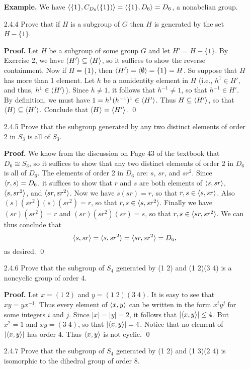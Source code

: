 \begin{enumerate}
      \textbf{Example.} We have $\langle \{1\}, C_{D_6}(\{1\}) \rangle =
      \langle \{1\}, D_6 \rangle= D_6$, a nonabelian group.
   \item[2.4.4]   Prove that if $H$ is a subgroup of $G$ then $H$ is generated
                  by the set $H - \{1\}$.

      \textbf{Proof.} Let $H$ be a subgroup of some group $G$ and let
      $H' = H - \{1\}$. By Exercise 2, we have $\langle H' \rangle \subseteq \langle H \rangle$, so
      it suffices to show the reverse containment. Now if $H = \{1\}$, then
      $\langle H' \rangle = \langle \emptyset \rangle = \{1\} = H$. So suppose that $H$ has more
      than 1 element. Let $h$ be a nonidentity element in $H$ (i.e.,
      $h^1 \in H'$, and thus, $h^1 \in \langle H' \rangle$).
      Since $h \neq 1$, it follows that $h^{-1} \neq 1$, so that
      $h^{-1} \in H'$. By definition, we must
      have $1 = h^1(h^{-1})^1 \in  \langle H' \rangle$. Thus $H \subseteq \langle H' \rangle$, so
      that $\langle H \rangle \subseteq \langle H' \rangle$. Conclude that
      $\langle H \rangle = \langle H' \rangle$. \qed
   \item[2.4.5]   Prove that the subgroup generated by any two distinct elements
                  of order 2 in $S_3$ is all of $S_3$.

      \textbf{Proof.} We know from the discussion on Page 43 of the textbook
      that $D_6 \cong S_3$, so it suffices to show that any two distinct
      elements of order 2 in $D_6$ is all of $D_6$. The elements of order 2 in
      $D_6$ are: $s$, $sr$, and $sr^2$. Since $\langle r, s \rangle = D_6$, it suffices to
      show that $r$ and $s$ are both elements of $\langle s, sr \rangle$, $\langle s, sr^2 \rangle$,
      and $\langle sr, sr^2 \rangle$. Now we have $s(sr) = r$, so that
      $r, s \in \langle s, sr \rangle$. Also $(s)(sr^2)(s)(sr^2) = r$, so that
      $r, s \in \langle s, sr^2 \rangle$. Finally we have $(sr)(sr^2) = r$ and
      $(sr)(sr^2)(sr) = s$, so that $r, s \in \langle sr, sr^2 \rangle$. We can thus
      conclude that
      $$\langle s, sr \rangle = \langle s, sr^2 \rangle = \langle sr, sr^2 \rangle = D_6,$$
      as desired. \qed
   \item[2.4.6]   Prove that the subgroup of $S_4$ generated by (1 2) and
                  (1 2)(3 4) is a noncyclic group of order 4.

      \textbf{Proof.} Let $x = (1\;2)$ and $y = (1\;2)(3\;4)$. It is easy to see
      that $xy = yx^{-1}$. Thus every element of $\langle x, y \rangle$ can be written in
      the form $x^iy^j$ for some integers $i$ and $j$. Since $|x| = |y| = 2$, it
      follows that $|\langle x, y \rangle| \le 4$. But $x^2 = 1$ and $xy = (3\;4)$, so
      that $|\langle x, y \rangle| = 4$. Notice that no element of $|\langle x, y \rangle|$ has
      order 4. Thus $\langle x, y \rangle$ is not cyclic. \qed
   \item[2.4.7]   Prove that the subgroup of $S_4$ generated by (1 2) and
                  (1 3)(2 4) is isomorphic to the dihedral group of order 8.


\end{enumerate}
